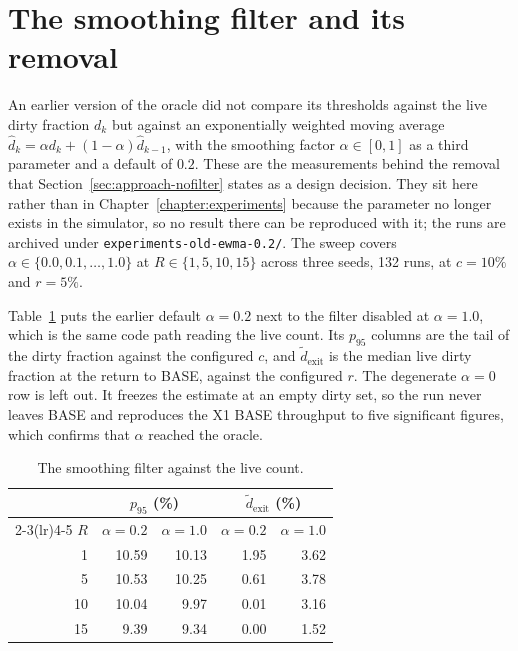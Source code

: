 \section{The smoothing filter and its removal}\label{sec:alpha-ablation}

An earlier version of the oracle did not compare its thresholds against
the live dirty fraction $d_k$ but against an exponentially weighted moving
average $\hat{d}_k = \alpha d_k + (1-\alpha)\hat{d}_{k-1}$, with the
smoothing factor $\alpha \in [0,1]$ as a third parameter and a default of
$0.2$. These are the measurements behind the removal that
Section~\ref{sec:approach-nofilter} states as a design decision. They sit
here rather than in Chapter~\ref{chapter:experiments} because the
parameter no longer exists in the simulator, so no result there can be
reproduced with it; the runs are archived under
\texttt{experiments-old-ewma-0.2/}. The sweep covers
$\alpha \in \{0.0, 0.1, \dots, 1.0\}$ at $R \in \{1, 5, 10, 15\}$ across
three seeds, 132 runs, at $c = 10\%$ and $r = 5\%$.

Table~\ref{tab:alpha-grid} puts the earlier default $\alpha = 0.2$ next to
the filter disabled at $\alpha = 1.0$, which is the same code path reading
the live count. Its $p_{95}$ columns are the tail of the dirty fraction
against the configured $c$, and $\tilde{d}_{\mathrm{exit}}$ is the median live
dirty fraction at the return to BASE, against the configured $r$. The
degenerate $\alpha = 0$ row is left out. It freezes the estimate at an
empty dirty set, so the run never leaves BASE and reproduces the X1 BASE
throughput to five significant figures, which confirms that $\alpha$
reached the oracle.

\begin{table}[htbp]
  \centering
  \captionsetup{format=plain,justification=centering}
  \caption{The smoothing filter against the live count.}
  \label{tab:alpha-grid}
  \small
  \begin{tabular}{r r r r r}
    \toprule
        & \multicolumn{2}{c}{$p_{95}$ (\%)} & \multicolumn{2}{c}{$\tilde{d}_{\mathrm{exit}}$ (\%)} \\
    \cmidrule(lr){2-3}\cmidrule(lr){4-5}
    $R$ & $\alpha = 0.2$ & $\alpha = 1.0$ & $\alpha = 0.2$ & $\alpha = 1.0$ \\
    \midrule
    1   & 10.59 & 10.13 & 1.95 & 3.62 \\
    5   & 10.53 & 10.25 & 0.61 & 3.78 \\
    10  & 10.04 &  9.97 & 0.01 & 3.16 \\
    15  &  9.39 &  9.34 & 0.00 & 1.52 \\
    \bottomrule
  \end{tabular}
\end{table}

